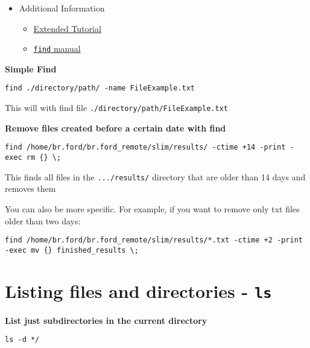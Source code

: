 \documentclass[
  letterpaper,
  DIV=11,
  numbers=noendperiod]{scrreprt}
\begin{document}
\begin{itemize}
\item
  Additional Information

  \begin{itemize}
  \item
    \href{https://shapeshed.com/unix-find/}{Extended Tutorial}
  \item
    \href{https://linux.die.net/man/1/find}{\texttt{find} manual}
  \end{itemize}
\end{itemize}

\textbf{Simple Find}

\begin{verbatim}
find ./directory/path/ -name FileExample.txt
\end{verbatim}

This will with find file \texttt{./directory/path/FileExample.txt}

\textbf{Remove files created before a certain date with find}

\begin{verbatim}
find /home/br.ford/br.ford_remote/slim/results/ -ctime +14 -print -exec rm {} \;
\end{verbatim}

This finds all files in the \texttt{.../results/} directory that are
older than 14 days and removes them

You can also be more specific. For example, if you want to remove only
txt files older than two days:

\begin{verbatim}
find /home/br.ford/br.ford_remote/slim/results/*.txt -ctime +2 -print -exec mv {} finished_results \;
\end{verbatim}

\hypertarget{listing-files-and-directories---ls}{%
\section*{\texorpdfstring{\textbf{Listing files and directories -
\texttt{ls}}}{Listing files and directories - ls}}\label{listing-files-and-directories---ls}}


\textbf{List just subdirectories in the current directory}

\begin{verbatim}
ls -d */
\end{verbatim}
\end{document}
